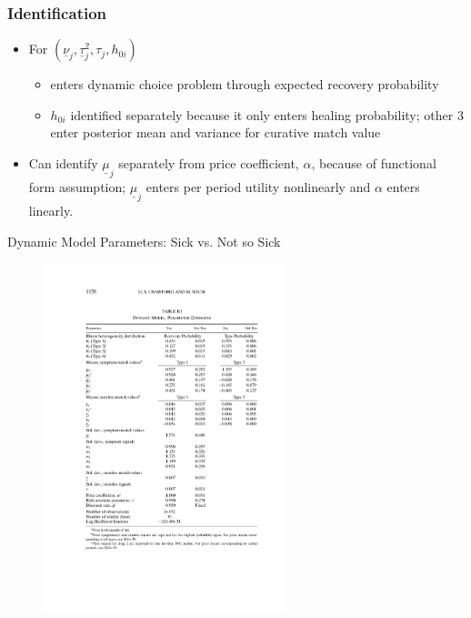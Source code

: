 \documentclass[xcolor=pdftex,dvipsnames,table,mathserif,aspectratio=169]{beamer}
\begin{document}
\begin{frame}
\frametitle{Identification}

\begin{itemize}
\item For $(\underline{\nu }_{j},\underline{\tau }_{j}^{2},\tau _{j},h_{0i})$

\begin{itemize}
\item enters dynamic choice problem through expected recovery probability

\item $h_{0i}$ identified separately because it only enters healing
probability; other 3 enter posterior mean and variance for curative match
value
\end{itemize}

\item Can identify $\underline{\mu }_{j}$ separately from price coefficient, 
$\alpha $, because of functional form assumption; $\underline{\mu }_{j}$
enters per period utility nonlinearly and $\alpha $ enters linearly.
\end{itemize}
\end{frame}


\begin{frame}{Dynamic Model Parameters: Sick vs. Not so Sick}
\begin{figure}[htbp]
\begin{center}
\includegraphics[width=7cm]{resources/crawfordshumparam.pdf}
\label{default}
\end{center}
\end{figure}
\end{frame}
\end{document}
